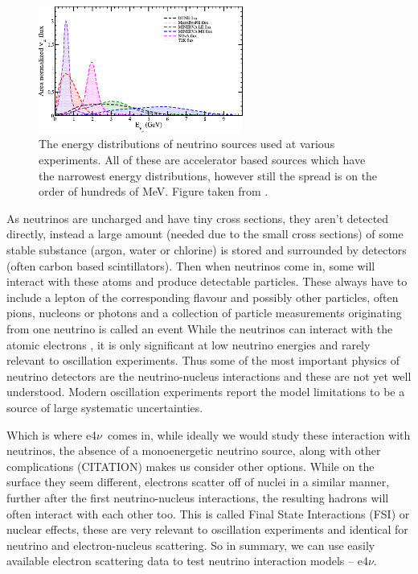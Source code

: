 \documentclass[a4paper,12pt]{article}
\newcommand{\efn}{e4$\nu$}
\begin{document}
\begin{figure}[h]
    \centering
    \includegraphics[width=0.6\textwidth]{figures/sourceEnergies.pdf}
    \caption{
        The energy distributions of neutrino sources used at various experiments.
        All of these are accelerator based sources which have the narrowest energy distributions, however still the spread is on the order of hundreds of \si{MeV}.
        Figure taken from \cite{sajjadatharNeutrinosTheirInteractions2023}.
    }
\end{figure}

As neutrinos are uncharged and have tiny cross sections, they aren't detected directly, instead a large amount (needed due to the small cross sections) of some stable substance (argon, water or chlorine) is stored and surrounded by detectors (often carbon based scintillators).
Then when neutrinos come in, some will interact with these atoms and produce detectable particles.
These always have to include a lepton of the corresponding flavour and possibly other particles, often pions, nucleons or photons and a collection of particle measurements originating from one neutrino is called an event
While the neutrinos can interact with the atomic electrons \cite{whittinghamScatteringLowEnergy2022}, it is only significant at low neutrino energies and rarely relevant to oscillation experiments.
Thus some of the most important physics of neutrino detectors are the neutrino-nucleus interactions and these are not yet well understood.
Modern oscillation experiments report the model limitations to be a source of large systematic uncertainties\cite{abeConstraintMatterAntimatter2020,novacollaborationNewConstraintsOscillation2018}.

Which is where \efn\ comes in, while ideally we would study these interaction with neutrinos, the absence of a monoenergetic neutrino source, along with other complications (CITATION) makes us consider other options.
While on the surface they seem different, electrons scatter off of nuclei in a similar manner, further after the first neutrino-nucleus interactions, the resulting hadrons will often interact with each other too.
This is called Final State Interactions (FSI) or nuclear effects, these are very relevant to oscillation experiments and identical for neutrino and electron-nucleus scattering.
So in summary, we can use easily available electron scattering data to test neutrino interaction models -- \efn.
\end{document}
